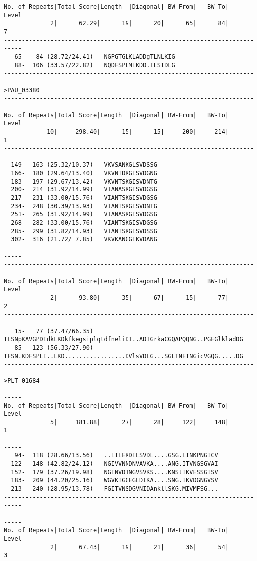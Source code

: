\begin{verbatim}
No. of Repeats|Total Score|Length  |Diagonal| BW-From|   BW-To|   Level
             2|      62.29|      19|      20|      65|      84|       7
---------------------------------------------------------------------------
   65-   84 (28.72/24.41)	NGPGTGLKLADDgTLNLKIG
   88-  106 (33.57/22.82)	NQDFSPLMLKDD.ILSIDLG
---------------------------------------------------------------------------
>PAU_03380
---------------------------------------------------------------------------
No. of Repeats|Total Score|Length  |Diagonal| BW-From|   BW-To|   Level
            10|     298.40|      15|      15|     200|     214|       1
---------------------------------------------------------------------------
  149-  163 (25.32/10.37)	VKVSANKGLSVDSSG
  166-  180 (29.64/13.40)	VKVNTDKGISVDGNG
  183-  197 (29.67/13.42)	VKVNTSKGISVDNTG
  200-  214 (31.92/14.99)	VIANASKGISVDGSG
  217-  231 (33.00/15.76)	VIANTSKGISVDGSG
  234-  248 (30.39/13.93)	VIANTSKGISVDNTG
  251-  265 (31.92/14.99)	VIANASKGISVDGSG
  268-  282 (33.00/15.76)	VIANTSKGISVDGSG
  285-  299 (31.82/14.93)	VIANTSKGISVDSSG
  302-  316 (21.72/ 7.85)	VKVKANGGIKVDANG
---------------------------------------------------------------------------
---------------------------------------------------------------------------
No. of Repeats|Total Score|Length  |Diagonal| BW-From|   BW-To|   Level
             2|      93.80|      35|      67|      15|      77|       2
---------------------------------------------------------------------------
   15-   77 (37.47/66.35)	TLSNpKAVGPDIdkLKDkfkegsiplqtdfneliDI..ADIGrkaCGQAPQQNG..PGEGlkladDG
   85-  123 (56.33/27.90)	TFSN.KDFSPLI..LKD.................DVlsVDLG...SGLTNETNGicVGQG.....DG
---------------------------------------------------------------------------
>PLT_01684
---------------------------------------------------------------------------
No. of Repeats|Total Score|Length  |Diagonal| BW-From|   BW-To|   Level
             5|     181.88|      27|      28|     122|     148|       1
---------------------------------------------------------------------------
   94-  118 (28.66/13.56)	..LILEKDILSVDL....GSG.LINKPNGICV
  122-  148 (42.82/24.12)	NGIVVNNDNVAVKA....ANG.ITVNGSGVAI
  152-  179 (37.26/19.98)	NGINVDTNGVSVKS....KNStIKVESSGISV
  183-  209 (44.20/25.16)	WGVKIGGEGLDIKA....SNG.IKVDGNGVSV
  213-  240 (28.95/13.78)	FGITVNSDGVNIDAnkllSKG.MIVMFSG...
---------------------------------------------------------------------------
---------------------------------------------------------------------------
No. of Repeats|Total Score|Length  |Diagonal| BW-From|   BW-To|   Level
             2|      67.43|      19|      21|      36|      54|       3

\end{verbatim}
